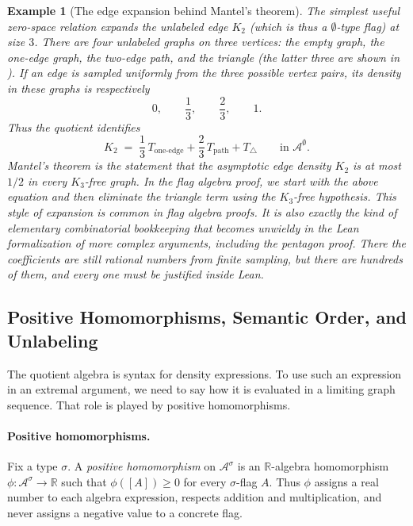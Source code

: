 \documentclass{article}
\newtheorem{example}[theorem]{Example}
\begin{document}
\begin{example}[The edge expansion behind Mantel's theorem]
  The simplest useful zero-space relation expands the unlabeled edge $K_2$ (which
  is thus a $\emptyset$-type flag) at
  size $3$.  There are four unlabeled graphs on three vertices: the empty
  graph, the one-edge graph, the two-edge path, and the triangle
  (the latter three are shown in ).  If an
  edge is sampled uniformly from the three possible vertex pairs, its density
  in these graphs is respectively
  \[
    0,\qquad \frac13,\qquad \frac23,\qquad 1.
  \]
  Thus the quotient identifies
  \[
    K_2
    \;=\;
    \frac13\,T_{\text{one-edge}}
    + \frac23\,T_{\text{path}}
    + T_{\triangle}
    \qquad\text{in } \mathcal{A}^{\emptyset}.
  \]
  Mantel's theorem is the statement that the asymptotic edge density $K_2$ is
  at most $1/2$ in every $K_3$-free graph.  In the flag algebra proof,
  we start with the above equation and then eliminate the triangle term
  using the $K_3$-free hypothesis.  This style of expansion is common in
  flag algebra proofs.  It is also exactly the kind of elementary
  combinatorial bookkeeping that becomes unwieldy in the Lean formalization of
  more complex arguments, including the pentagon proof.  There the coefficients
  are still rational numbers from finite sampling, but there are hundreds of
  them, and every one must be justified inside Lean.
\end{example}

\subsection{Positive Homomorphisms, Semantic Order, and Unlabeling}

The quotient algebra is syntax for density expressions.  To use such an
expression in an extremal argument, we need to say how it is evaluated in a
limiting graph sequence.  That role is played by positive homomorphisms.

\paragraph{Positive homomorphisms.}
Fix a type $\sigma$.  A \emph{positive homomorphism} on
$\mathcal{A}^\sigma$ is an $\mathbb{R}$-algebra homomorphism
$\phi:\mathcal{A}^\sigma \to \mathbb{R}$ such that
$\phi([A]) \geq 0$ for every $\sigma$-flag $A$.  Thus $\phi$ assigns a real
number to each algebra expression, respects addition and multiplication, and
never assigns a negative value to a concrete flag.
\end{document}
